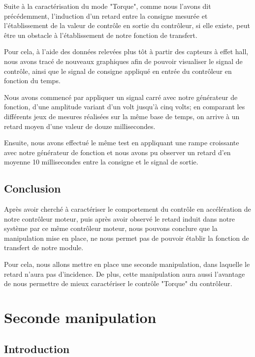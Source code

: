 \documentclass[french,a4paper,12pt]{report}
\begin{document}
		Suite à la caractérisation du mode "Torque", comme nous l'avons dit précédemment, l'induction d'un retard entre la consigne mesurée et l'établissement de la valeur de contrôle en sortie du contrôleur, si elle existe, peut être un obstacle à l'établissement de notre fonction de transfert.
		
		Pour cela, à l'aide des données relevées plus tôt à partir des capteurs à effet hall, nous avons tracé de nouveaux graphiques afin de pouvoir visualiser le signal de contrôle, ainsi que le signal de consigne appliqué en entrée du contrôleur en fonction du temps.
		
		Nous avons commencé par appliquer un signal carré avec notre générateur de fonction, d'une amplitude variant d'un volt jusqu'à cinq volts; en comparant les différents jeux de mesures réalisées sur la même base de temps, on arrive à un retard moyen d'une valeur de douze millisecondes.
		
		Ensuite, nous avons effectué le même test en appliquant une rampe croissante avec notre générateur de fonction et nous avons pu observer un retard d'en moyenne 10 millisecondes entre la consigne et le signal de sortie.
		
		\section{Conclusion}
		Après avoir cherché à caractériser le comportement du contrôle en accélération de notre contrôleur moteur, puis après avoir observé le retard induit dans notre système par ce même contrôleur moteur, nous pouvons conclure que la manipulation mise en place, ne nous permet pas de pouvoir établir la fonction de transfert de notre module.
		
		Pour cela, nous allons mettre en place une seconde manipulation, dans laquelle le retard n'aura pas d'incidence. De plus, cette manipulation aura aussi l'avantage de nous permettre de mieux caractériser le contrôle "Torque" du contrôleur.
		
		\newpage		
		
	\chapter{Seconde manipulation}
	
		\section{Introduction}
	
\end{document}
